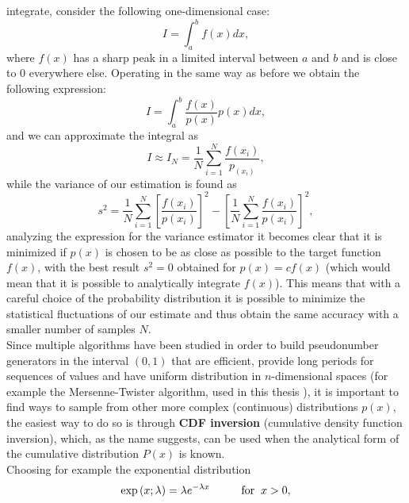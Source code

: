 integrate, consider the following one-dimensional case:
\begin{equation}
    I=\int_{a}^{b}f(x)dx,
\end{equation}
where $f(x)$ has a sharp peak in a limited interval between $a$ and $b$ and is close to 0 everywhere else. Operating in the same 
way as before we obtain the following expression:
\begin{equation}
    I=\int_{a}^{b}\frac{f(x)}{p(x)}p(x)dx,
\end{equation}
and we can approximate the integral as
\begin{equation}
    I\approx I_N=\frac{1}{N}\sum_{i=1}^N\frac{f(x_i)}{p_(x_i)},
\end{equation}
while the variance of our estimation is found as 
\begin{equation}
    s^2=\frac{1}{N}\sum_{i=1}^N\left[\frac{f(x_i)}{p(x_i)}\right]^2-\left[\frac{1}{N}\sum_{i=1}^N\frac{f(x_i)}{p(x_i)}\right]^2,
\end{equation}
analyzing the expression for the variance estimator it becomes clear that it is minimized if $p(x)$ is chosen to be as close as 
possible to the target function $f(x)$, with the best result $s^2=0$ obtained for $p(x) = cf(x)$ (which would mean that it is possible to analytically 
integrate $f(x)$). This means that with a careful choice of the probability distribution it is possible to minimize the statistical fluctuations 
of our estimate and thus obtain the same accuracy with a smaller number of samples $N$.\\
Since multiple algorithms have been studied in order to build pseudonumber generators in the interval $(0,1)$ that are efficient, provide long periods 
for sequences of values and have uniform distribution in $n$-dimensional spaces (for example the Mersenne-Twister algorithm, used in this thesis \cite{matsumoto1998mersenne}), 
it is important to find ways to sample from other more complex (continuous) distributions $p(x)$, the easiest way to do so is through \textbf{CDF inversion} 
(cumulative density function inversion), which, as the name suggests, can be used when the analytical form of the cumulative distribution 
$P(x)$ is known.\\
Choosing for example the exponential distribution 
\begin{equation}
    \exp{\left(x;\lambda\right)}=\lambda e^{-\lambda x}\hspace{1cm}\text{for}\hspace{0.2cm}x>0, 
\end{equation}
